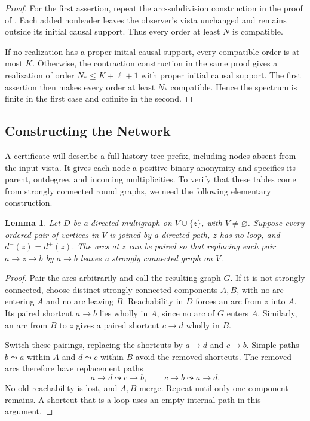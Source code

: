 \documentclass[11pt]{article}
\newtheorem{lemma}{Lemma}
\begin{document}
\begin{proof}
For the first assertion, repeat the arc-subdivision construction in
the proof of . Each added nonleader
leaves the observer's vista unchanged and remains outside its
initial causal support. Thus every order at least \(N\) is compatible.

If no realization has a proper initial causal support, every
compatible order is at most \(K\). Otherwise, the contraction
construction in the same proof gives a realization of order
\(N_*\leq K+\ell+1\) with proper initial causal support.
The first assertion then makes every order at least \(N_*\)
compatible. Hence the spectrum is finite in the first case and
cofinite in the second.
\end{proof}

\subsection{Constructing the Network}

A certificate will describe a full history-tree prefix, including
nodes absent from the input vista.  It gives each node a positive
binary anonymity and specifies its parent, outdegree, and incoming
multiplicities.  To verify that these tables come from strongly
connected round graphs, we need the following elementary construction.

\begin{lemma}
\label{lem:conp-balanced-vertex}
Let \(D\) be a directed multigraph on \(V\cup\{z\}\), with
\(V\neq\varnothing\).  Suppose every ordered pair of vertices in
\(V\) is joined by a directed path, \(z\) has no loop, and
\(d^-(z)=d^+(z)\).  The arcs at \(z\) can be paired so that replacing
each pair \(a\to z\to b\) by \(a\to b\) leaves a strongly
connected graph on \(V\).
\end{lemma}

\begin{proof}
Pair the arcs arbitrarily and call the resulting graph \(G\).
If it is not strongly connected, choose distinct strongly connected
components \(A,B\), with no arc entering \(A\) and no arc leaving
\(B\).  Reachability in \(D\) forces an arc from \(z\) into
\(A\).  Its paired shortcut \(a\to b\) lies wholly in \(A\),
since no arc of \(G\) enters \(A\).  Similarly, an arc from
\(B\) to \(z\) gives a paired shortcut \(c\to d\) wholly in \(B\).

Switch these pairings, replacing the shortcuts by \(a\to d\)
and \(c\to b\).  Simple paths \(b\leadsto a\) within \(A\)
and \(d\leadsto c\) within \(B\) avoid the removed shortcuts.
The removed arcs therefore have replacement paths
\[
 a\to d\leadsto c\to b,
 \qquad c\to b\leadsto a\to d.
\]
No old reachability is lost, and \(A,B\) merge.  Repeat until only
one component remains.  A shortcut that is a loop uses an empty
internal path in this argument.
\end{proof}
\end{document}
